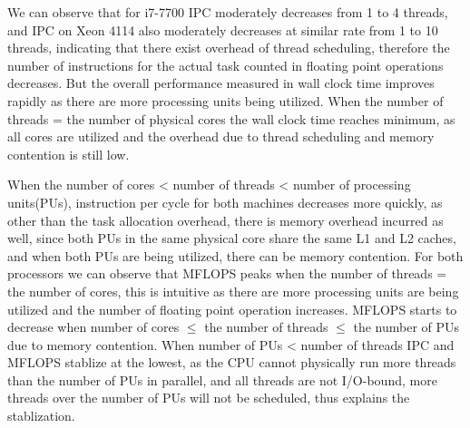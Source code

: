 \documentclass[9pt]{extarticle}
\begin{document}
We can observe that for i7-7700 IPC moderately decreases from 1 to 4 threads, and IPC on Xeon 4114 
also moderately decreases at similar rate from 1 to 10 threads,
indicating that there exist overhead of thread scheduling, therefore the number of instructions 
for the actual task counted in floating point operations decreases. But the overall performance measured in wall 
clock time improves rapidly as there are more processing units being utilized. 
When the number of threads = the number of physical cores the wall clock time reaches minimum, as all cores are utilized 
and the overhead due to thread scheduling and memory contention is still low.\\
\begin{minipage}{0.5\linewidth}
    \noindent{}
\end{minipage}\hfill
\begin{minipage}{0.5\linewidth}
When the number of cores < number of threads < number of processing units(PUs), instruction per cycle for both
machines decreases more quickly, as other than the task allocation overhead, there is memory overhead incurred as well, since both PUs 
in the same physical core share the same L1 and L2 caches, and when both PUs are being utilized, there can be memory contention. 
For both processors we can observe that MFLOPS peaks when the number of threads
= the number of cores, this is intuitive as there are more processing units are being utilized and the number of floating 
point operation increases. MFLOPS starts to decrease when number of cores $\leq$ the number of threads $\leq$ 
the number of PUs due to memory contention. When number of PUs < number of threads IPC and MFLOPS stablize at the lowest, 
as the CPU cannot physically run more threads than the number of PUs in parallel, and all threads are not I/O-bound, 
more threads over the number of PUs will not be scheduled, thus explains 
the stablization. 
\end{minipage}\hfill
\end{document}
